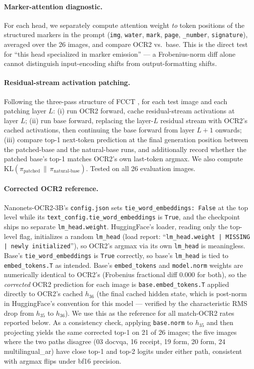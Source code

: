 \documentclass[10pt,twocolumn,letterpaper]{article}
\begin{document}
\paragraph{Marker-attention diagnostic.} For each head, we separately compute attention weight \emph{to} token positions of the structured markers in the prompt (\texttt{img}, \texttt{water}, \texttt{mark}, \texttt{page}, \texttt{\_number}, \texttt{signature}), averaged over the 26 images, and compare OCR2 vs.\ base. This is the direct test for ``this head specialized in marker emission'' --- a Frobenius-norm diff alone cannot distinguish input-encoding shifts from output-formatting shifts.

\paragraph{Residual-stream activation patching.} Following the three-pass structure of FCCT \citep{li2025fcct}, for each test image and each patching layer $L$: (i) run OCR2 forward, cache residual-stream activations at layer $L$; (ii) run base forward, replacing the layer-$L$ residual stream with OCR2's cached activations, then continuing the base forward from layer $L{+}1$ onwards; (iii) compare top-1 next-token prediction at the final generation position between the patched-base and the natural-base runs, and additionally record whether the patched base's top-1 matches OCR2's own last-token argmax. We also compute $\mathrm{KL}(\pi_{\text{patched}} \,\|\, \pi_{\text{natural-base}})$. Tested on all 26 evaluation images.

\paragraph{Corrected OCR2 reference.} Nanonets-OCR2-3B's \texttt{config.json} sets \texttt{tie\_word\_embeddings: False} at the top level while its \texttt{text\_config.tie\_word\_embeddings} is \texttt{True}, and the checkpoint ships no separate \texttt{lm\_head.weight}. HuggingFace's loader, reading only the top-level flag, initializes a random \texttt{lm\_head} (load report: ``\texttt{lm\_head.weight | MISSING | newly initialized}''), so OCR2's argmax via its own \texttt{lm\_head} is meaningless. Base's \texttt{tie\_word\_embeddings} is \texttt{True} correctly, so base's \texttt{lm\_head} is tied to \texttt{embed\_tokens.T} as intended. Base's \texttt{embed\_tokens} and \texttt{model.norm} weights are numerically identical to OCR2's (Frobenius fractional diff $0.000$ for both), so the \emph{corrected} OCR2 prediction for each image is \texttt{base.embed\_tokens.T} applied directly to OCR2's cached $h_{36}$ (the final cached hidden state, which is post-norm in HuggingFace's convention for this model --- verified by the characteristic RMS drop from $h_{35}$ to $h_{36}$). We use this as the reference for all match-OCR2 rates reported below. As a consistency check, applying \texttt{base.norm} to $h_{35}$ and then projecting yields the same corrected top-1 on 21 of 26 images; the five images where the two paths disagree (03 docvqa, 16 receipt, 19 form, 20 form, 24 multilingual\_ar) have close top-1 and top-2 logits under either path, consistent with argmax flips under bf16 precision.
\end{document}
